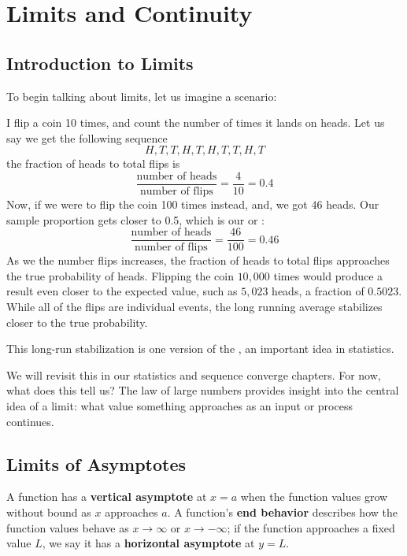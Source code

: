 \chapter{Limits and Continuity}\label{chap:limits}
\section{Introduction to Limits }

To begin talking about limits, let us imagine a scenario: 

I flip a coin 10 times, and count the number of times it lands on heads. Let us say we get the following sequence
\[
H, T, T, H, T, H, T, T, H, T
\]
the fraction of heads to total flips is 
\[
\frac{\text{number of heads}}{\text{number of flips}} = \frac{4}{10} = 0.4
\]
Now, if we were to flip the coin 100 times instead, and, we got $46$ heads. Our sample proportion gets closer to 0.5, which is our  or :
\[
\frac{\text{number of heads}}{\text{number of flips}} = \frac{46}{100} = 0.46
\]
As we the number flips increases, the fraction of heads to total flips approaches the true probability of heads. Flipping the coin $10{,}000$ times would produce a result even closer to the expected value, such as $5{,}023$ heads, a fraction of $0.5023$. While all of the flips are individual events, the long running average stabilizes closer to the true probability.

This long-run stabilization is one version of the , an important idea in statistics. 

We will revisit this in our statistics and sequence converge chapters. For now, what does this tell us? The law of large numbers provides insight into the central idea of a limit: what value something approaches as an input or process continues.

\section{Limits of Asymptotes}
A function has a \textbf{vertical asymptote} at $x = a$ when the function values grow without bound as $x$ approaches $a$. A function's \textbf{end behavior} describes how the function values behave as $x \to \infty$ or $x \to -\infty$; if the function approaches a fixed value $L$, we say it has a \textbf{horizontal asymptote} at $y = L$.

